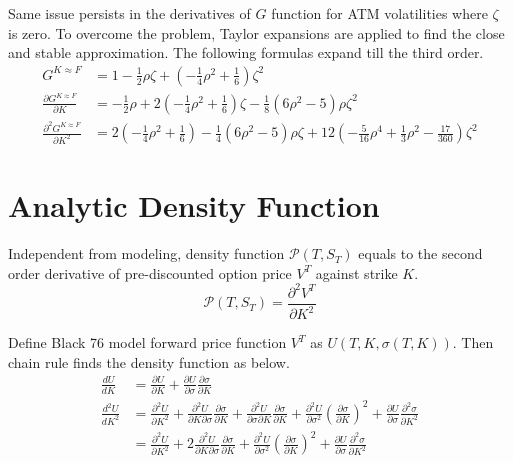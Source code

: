 \documentclass{article}
\begin{document}
Same issue persists in the derivatives of $ G $ function for ATM volatilities where $ \zeta $ is zero.
To overcome the problem, Taylor expansions are applied to find the close and stable approximation.
The following formulas expand till the third order.
\begin{subequations}
    \begin{align}
        G^{K \approx F} &= 1 - \frac{1}{2} \rho \zeta + \left(-\frac{1}{4} \rho^2 + \frac{1}{6}\right) \zeta^2 \\
        \frac{\partial G^{K \approx F}}{\partial K} &= -\frac{1}{2} \rho  + 2 \left(-\frac{1}{4} \rho^2 + \frac{1}{6}\right) \zeta - \frac{1}{8} \left(6 \rho^2 - 5\right) \rho \zeta^2 \\
        \frac{\partial^2 G^{K \approx F}}{\partial K^2} &= 2 \left(-\frac{1}{4} \rho^2 + \frac{1}{6}\right) - \frac{1}{4} \left(6 \rho^2 - 5\right) \rho \zeta + 12 \left(-\frac{5}{16} \rho^4 + \frac{1}{3} \rho^2 - \frac{17}{360}\right) \zeta^2
    \end{align}
\end{subequations}


\section{Analytic Density Function}

Independent from modeling, density function $ \mathcal{P}\left(T, S_T\right) $ equals to the second order derivative of pre-discounted option price $ V^T $ against strike $ K $.
\begin{equation}
    \mathcal{P}\left(T, S_T\right) = \frac{\partial^2 V^T}{\partial K^2}
\end{equation}

Define Black 76 model forward price function $ V^T $ as $ U\left(T, K, \sigma(T, K)\right) $.
Then chain rule finds the density function as below.
\begin{align}
    \frac{d U}{d K} &= \frac{\partial U}{\partial K} + \frac{\partial U}{\partial \sigma} \frac{\partial \sigma}{\partial K} \\
    \frac{d^2 U}{d K^2} &= \frac{\partial^2 U}{\partial K^2} + \frac{\partial^2 U}{\partial K \partial \sigma} \frac{\partial \sigma}{\partial K}  + \frac{\partial^2 U}{\partial \sigma \partial K} \frac{\partial \sigma}{\partial K} + \frac{\partial^2 U}{\partial \sigma^2} \left(\frac{\partial \sigma}{\partial K}\right)^2 + \frac{\partial U}{\partial \sigma} \frac{\partial^2 \sigma}{\partial K^2} \nonumber \\
    &= \frac{\partial^2 U}{\partial K^2} + 2 \frac{\partial^2 U}{\partial K \partial \sigma} \frac{\partial \sigma}{\partial K} + \frac{\partial^2 U}{\partial \sigma^2} \left(\frac{\partial \sigma}{\partial K}\right)^2 + \frac{\partial U}{\partial \sigma} \frac{\partial^2 \sigma}{\partial K^2} \label{d2U_per_dK2}
\end{align}
\end{document}
